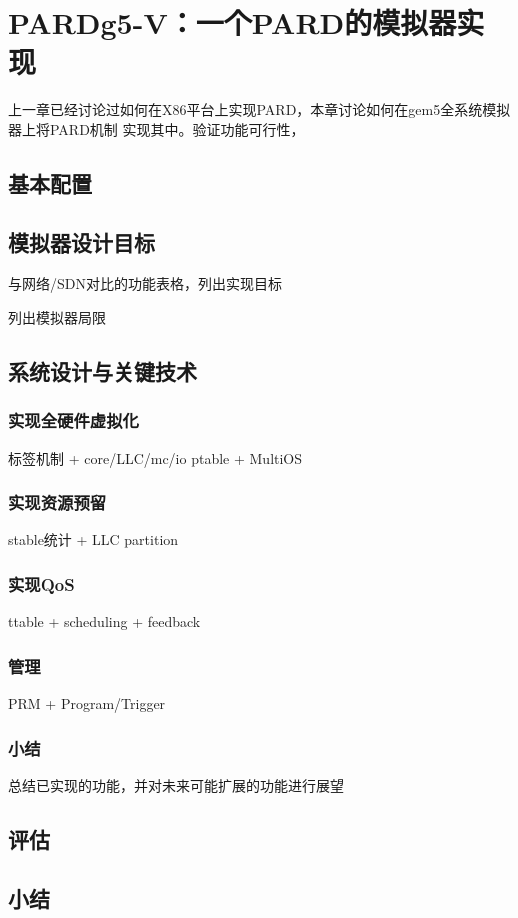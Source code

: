 

\chapter{PARDg5-V：一个PARD的模拟器实现}
\label{cha:pardg5v}

上一章已经讨论过如何在X86平台上实现PARD，本章讨论如何在gem5全系统模拟器上将PARD机制
实现其中。验证功能可行性，

\section{基本配置}

\section{模拟器设计目标}

与网络/SDN对比的功能表格，列出实现目标

列出模拟器局限

\section{系统设计与关键技术}

\subsection{实现全硬件虚拟化}

标签机制 + core/LLC/mc/io
ptable + MultiOS

\subsection{实现资源预留}

stable统计 + LLC partition

\subsection{实现QoS}

ttable + scheduling + feedback

\subsection{管理}

PRM + Program/Trigger

\subsection{小结}

总结已实现的功能，并对未来可能扩展的功能进行展望

\section{评估}

\section{小结}


